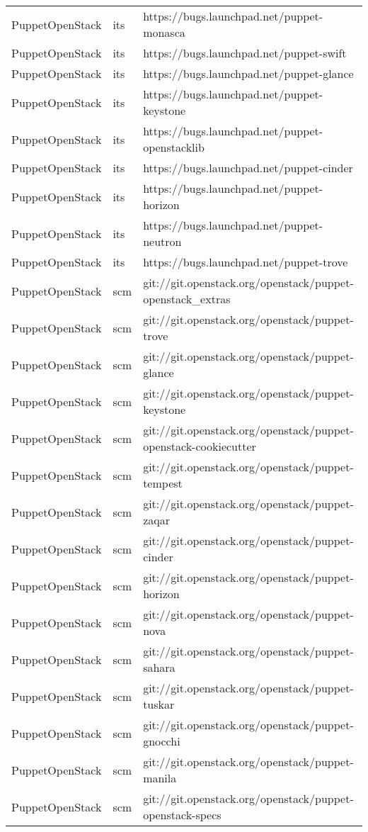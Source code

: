 \begin{center}
\begin{longtable}{|p{4cm}|p{1cm}|p{10cm}|}
PuppetOpenStack&its&https://bugs.launchpad.net/puppet-monasca\\ 
PuppetOpenStack&its&https://bugs.launchpad.net/puppet-swift\\ 
PuppetOpenStack&its&https://bugs.launchpad.net/puppet-glance\\ 
PuppetOpenStack&its&https://bugs.launchpad.net/puppet-keystone\\ 
PuppetOpenStack&its&https://bugs.launchpad.net/puppet-openstacklib\\ 
PuppetOpenStack&its&https://bugs.launchpad.net/puppet-cinder\\ 
PuppetOpenStack&its&https://bugs.launchpad.net/puppet-horizon\\ 
PuppetOpenStack&its&https://bugs.launchpad.net/puppet-neutron\\ 
PuppetOpenStack&its&https://bugs.launchpad.net/puppet-trove\\ 
PuppetOpenStack&scm&git://git.openstack.org/openstack/puppet-openstack\_extras\\ 
PuppetOpenStack&scm&git://git.openstack.org/openstack/puppet-trove\\ 
PuppetOpenStack&scm&git://git.openstack.org/openstack/puppet-glance\\ 
PuppetOpenStack&scm&git://git.openstack.org/openstack/puppet-keystone\\ 
PuppetOpenStack&scm&git://git.openstack.org/openstack/puppet-openstack-cookiecutter\\ 
PuppetOpenStack&scm&git://git.openstack.org/openstack/puppet-tempest\\ 
PuppetOpenStack&scm&git://git.openstack.org/openstack/puppet-zaqar\\ 
PuppetOpenStack&scm&git://git.openstack.org/openstack/puppet-cinder\\ 
PuppetOpenStack&scm&git://git.openstack.org/openstack/puppet-horizon\\ 
PuppetOpenStack&scm&git://git.openstack.org/openstack/puppet-nova\\ 
PuppetOpenStack&scm&git://git.openstack.org/openstack/puppet-sahara\\ 
PuppetOpenStack&scm&git://git.openstack.org/openstack/puppet-tuskar\\ 
PuppetOpenStack&scm&git://git.openstack.org/openstack/puppet-gnocchi\\ 
PuppetOpenStack&scm&git://git.openstack.org/openstack/puppet-manila\\ 
PuppetOpenStack&scm&git://git.openstack.org/openstack/puppet-openstack-specs\\ 

\end{longtable}
\end{center}
